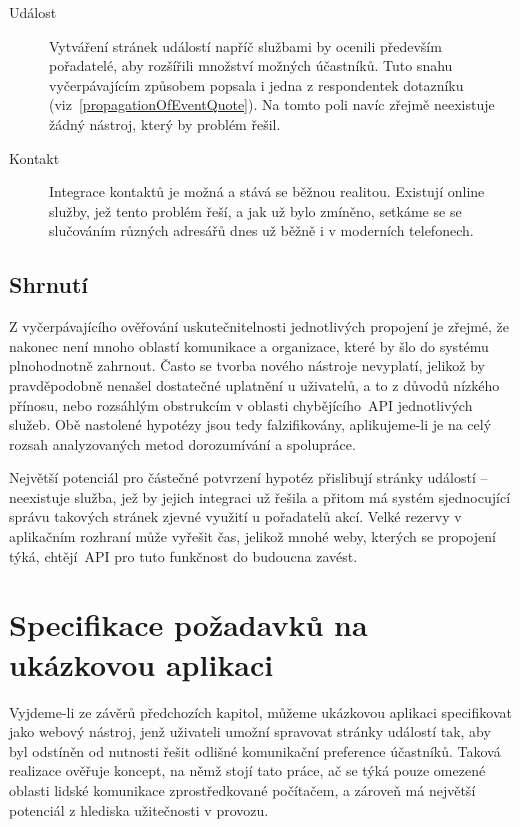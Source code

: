 \documentclass[12pt,oneside,final]{fithesis2}
\begin{document}
\begin{description}
    \item[Událost]
        Vytváření stránek událostí napříč službami by ocenili především pořadatelé, aby rozšířili množství možných účastníků. Tuto snahu vyčerpávajícím způsobem popsala i jedna z respondentek dotazníku (viz~\ref{propagationOfEventQuote}). Na tomto poli navíc zřejmě neexistuje žádný nástroj, který by problém řešil.

    \item[Kontakt]
        Integrace kontaktů je možná a stává se běžnou realitou. Existují online služby, jež tento problém řeší, a jak už bylo zmíněno, setkáme se se slučováním různých adresářů dnes už běžně i v moderních telefonech.
\end{description}

\section{Shrnutí}
Z vyčerpávajícího ověřování uskutečnitelnosti jednotlivých propojení je zřejmé, že nakonec není mnoho oblastí komunikace a organizace, které by šlo do systému plnohodnotně zahrnout. Často se tvorba nového nástroje nevyplatí, jelikož by pravděpodobně nenašel dostatečné uplatnění u uživatelů, a to z důvodů nízkého přínosu, nebo rozsáhlým obstrukcím v oblasti chybějícího~API jednotlivých služeb. Obě nastolené hypotézy jsou tedy falzifikovány, aplikujeme-li je na celý rozsah analyzovaných metod dorozumívání a spolupráce.

Největší potenciál pro částečné potvrzení hypotéz přislibují stránky událostí -- neexistuje služba, jež by jejich integraci už řešila a přitom má systém sjednocující správu takových stránek zjevné využití u pořadatelů akcí. Velké rezervy v aplikačním rozhraní může vyřešit čas, jelikož mnohé weby, kterých se propojení týká, chtějí~API pro tuto funkčnost do budoucna zavést.


\chapter{Specifikace požadavků na ukázkovou aplikaci}
Vyjdeme-li ze závěrů předchozích kapitol, můžeme ukázkovou aplikaci specifikovat jako webový nástroj, jenž uživateli umožní spravovat stránky událostí tak, aby byl odstíněn od nutnosti řešit odlišné komunikační preference účastníků. Taková realizace ověřuje koncept, na němž stojí tato práce, ač se týká pouze omezené oblasti lidské komunikace zprostředkované počítačem, a zároveň má největší potenciál z hlediska užitečnosti v provozu.
\end{document}

